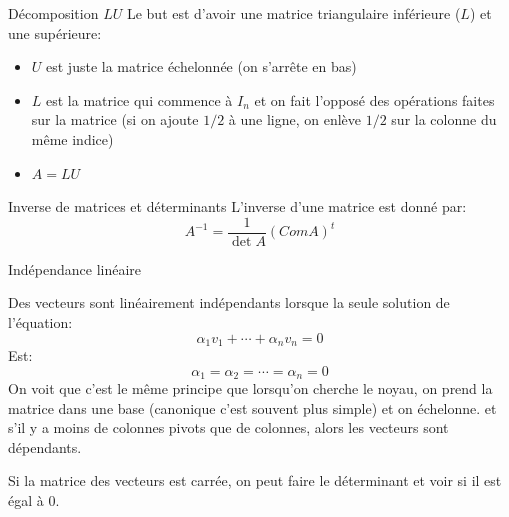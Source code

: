 \begin{parag}{Décomposition $LU$}
    Le but est d'avoir une matrice triangulaire inférieure ($L$) et une supérieure:
    \begin{itemize}
        \item $U$ est juste la matrice échelonnée (on s'arrête en bas)
        \item $L$ est la matrice qui commence à $I_n$ et on fait l'opposé des opérations faites sur la matrice (si on ajoute $1/2$ à une ligne, on enlève $1/2$ sur la colonne du même indice)
        \item $A = LU$
    \end{itemize}
\end{parag}
\begin{parag}{Inverse de matrices et déterminants}
    L'inverse d'une matrice est donné par:
    \[A^{-1} = \frac{1}{\det A}(Com A)^t\]
    
\end{parag}


\begin{parag}{Indépendance linéaire}
    \begin{truc}
        Des vecteurs sont linéairement indépendants lorsque la seule solution de l'équation:
        \[\alpha_1v_1 + \cdots + \alpha_n v_n = 0\]
        Est:
        \[\alpha_1 = \alpha_2 = \cdots = \alpha_n = 0\]
        On voit que c'est le même principe que lorsqu’on cherche le noyau, on prend la matrice dans une base (canonique c'est souvent plus simple) et on échelonne. et s'il y a moins de colonnes pivots que de colonnes, alors les vecteurs sont dépendants.
        
    \end{truc}
    \begin{truc}
        Si la matrice des vecteurs est carrée, on peut faire le déterminant et voir si il est égal à 0.
    \end{truc}
    
    
\end{parag}


